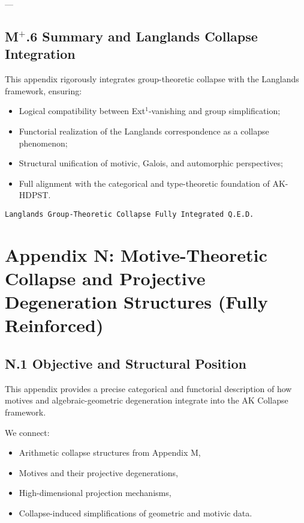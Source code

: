 \documentclass[11pt]{article}
\begin{document}
---

\subsection*{M$^{+}$.6 Summary and Langlands Collapse Integration}

This appendix rigorously integrates group-theoretic collapse with the Langlands framework, ensuring:

\begin{itemize}
    \item Logical compatibility between Ext$^1$-vanishing and group simplification;
    \item Functorial realization of the Langlands correspondence as a collapse phenomenon;
    \item Structural unification of motivic, Galois, and automorphic perspectives;
    \item Full alignment with the categorical and type-theoretic foundation of AK-HDPST.
\end{itemize}

\begin{flushright}
\texttt{Langlands Group-Theoretic Collapse \quad Fully Integrated \quad Q.E.D.}
\end{flushright}




\section*{Appendix N: Motive-Theoretic Collapse and Projective Degeneration Structures (Fully Reinforced)}

\subsection*{N.1 Objective and Structural Position}

This appendix provides a precise categorical and functorial description of how motives and algebraic-geometric degeneration integrate into the AK Collapse framework.  

We connect:
\begin{itemize}
  \item Arithmetic collapse structures from Appendix M,
  \item Motives and their projective degenerations,
  \item High-dimensional projection mechanisms,
  \item Collapse-induced simplifications of geometric and motivic data.
\end{itemize}
\end{document}
